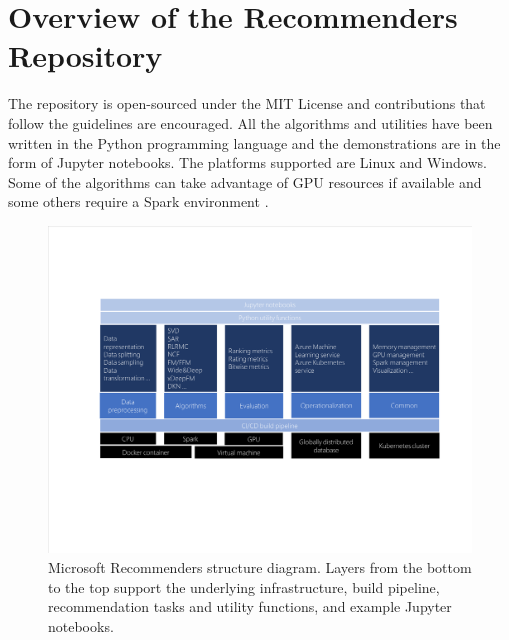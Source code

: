 \section{Overview of the Recommenders Repository}

The repository is open-sourced under the MIT License and contributions that follow the guidelines are encouraged.  
All the algorithms and utilities have been written in the Python programming language and the demonstrations are 
in the form of Jupyter notebooks.
The platforms supported are Linux and Windows. Some of the algorithms can take advantage of GPU resources if available 
and some others require a Spark environment \cite{meng2016mllib}.

\begin{figure}
  \centering
  \includegraphics[width=\textwidth,keepaspectratio]{platform_diagram_crop.pdf}
  \caption{Microsoft Recommenders structure diagram. Layers from the bottom to the top support the underlying 
  infrastructure, build pipeline, recommendation tasks and utility functions, and example Jupyter notebooks.}
\end{figure}

%
%
